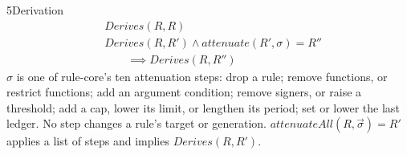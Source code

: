 \begin{perchdefinition}{5}{Derivation}\label{def:derivation}
\[\begin{aligned}&\mathit{Derives}(R, R)\\
&\mathit{Derives}(R, R') \land \mathit{attenuate}(R', \sigma) = R''\\
&\qquad \implies \mathit{Derives}(R, R'')\end{aligned}\]
\(\sigma\) is one of rule-core's ten attenuation steps: drop a rule; remove functions, or restrict functions; add an argument condition; remove signers, or raise a threshold; add a cap, lower its limit, or lengthen its period; set or lower the last ledger. No step changes a rule's target or generation. \(\mathit{attenuateAll}(R, \vec\sigma) = R'\) applies a list of steps and implies \(\mathit{Derives}(R, R')\).
\end{perchdefinition}
